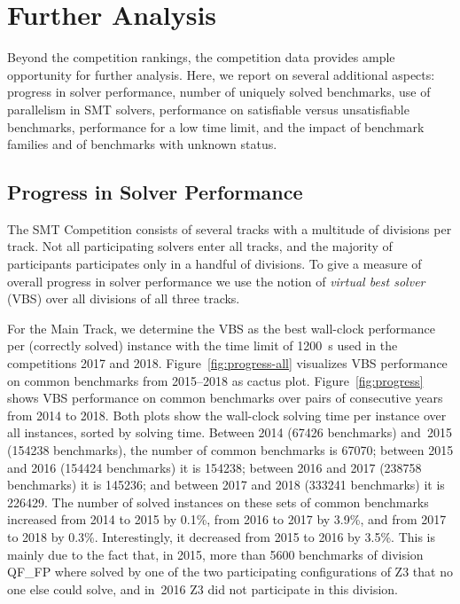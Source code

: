 \documentclass[dvipsnames,table,twoside,11pt]{article}
\newcommand{\maintrack}{Main Track\xspace}
\begin{document}
\section{Further Analysis}
\label{sec:analysis}

Beyond the competition rankings, the competition data provides ample
opportunity for further analysis.  Here, we report on several
additional aspects: progress in solver performance, number of uniquely
solved benchmarks, use of parallelism in SMT solvers, performance on
satisfiable versus unsatisfiable benchmarks, performance for a low
time limit, and the impact of benchmark families and of benchmarks
with unknown status.

\subsection{Progress in Solver Performance}

The SMT Competition consists of several tracks with a multitude of divisions
per track.
Not all participating solvers enter all tracks, and the majority of
participants participates only in a handful of divisions.
To give a measure of overall progress in solver performance we
use the notion of \emph{virtual best solver} (VBS) over all divisions of all
three tracks.

For the \maintrack, we determine the VBS as the best wall-clock
performance per (correctly solved) instance with the time limit of \SI{1200}{s} used
in the competitions 2017 and 2018. Figure~\ref{fig:progress-all} visualizes VBS
performance on common benchmarks from 2015--2018 as cactus plot.
Figure~\ref{fig:progress} shows VBS performance on common benchmarks over pairs
of consecutive years from 2014 to 2018.  Both plots show the wall-clock solving
time per instance over all instances, sorted by solving time.
%
Between 2014 (\num{67426} benchmarks) and~2015 (\num{154238} benchmarks),
the number of common benchmarks is \num{67070};
between 2015 and 2016 (\num{154424} benchmarks) it is \num{154238};
between 2016 and 2017 (\num{238758} benchmarks) it is \num{145236};
and between 2017 and 2018 (\num{333241} benchmarks) it is \num{226429}.
The number of solved instances on these sets of common benchmarks
increased from 2014 to 2015 by 0.1\%, from 2016 to 2017 by 3.9\%,
and from 2017 to 2018 by 0.3\%.
Interestingly, it decreased from 2015 to 2016 by 3.5\%.
This is mainly due to the fact that, in 2015, more than \num{5600} benchmarks of
division QF\_FP where solved by one of the two participating configurations of
Z3 that no one else could solve, and in~2016 Z3 did not participate in this
division.
\end{document}
